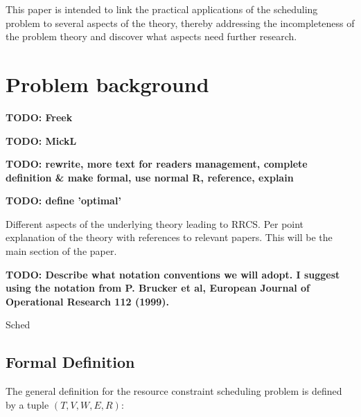 \documentclass{article}
\newcommand{\TODO}[1]{{\color{red}\textbf{TODO: #1}}}
\begin{document}
This paper is intended to link the practical applications of the scheduling problem to several aspects of the theory, thereby addressing the incompleteness of the problem theory and discover what aspects need further research.

\newpage

\section{Problem background}
\TODO{Freek}

\TODO{MickL}

\TODO{rewrite, more text for readers management, complete definition \& make formal, use normal R, reference, explain}

\TODO{define 'optimal'}

Different aspects of the underlying theory leading to RRCS.
 Per point explanation of the theory with references to relevant papers.
This will be the main section of the paper.

\TODO{Describe what notation conventions we will adopt.
I suggest using the notation from P. Brucker et al, European Journal of Operational Research 112 (1999). }

Sched
\subsection{Formal Definition}
The general definition for the resource constraint scheduling problem is defined by a tuple $(T, V, W, E, R)$: \cite{brucker99}
\end{document}
